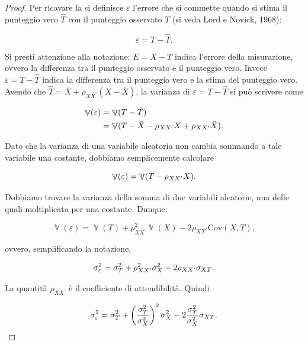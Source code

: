 \documentclass[
  11pt,
]{krantz}
\DeclareMathOperator{\V}{\mathbb{V}} %
\theoremstyle{definition}
\theoremstyle{definition}
\theoremstyle{definition}
\theoremstyle{definition}
\theoremstyle{remark}
\begin{document}
\begin{proof}
Per ricavare la \label{eq:std-err-estimate} si definisce \(\varepsilon\) l'errore che si commette quando si stima il punteggio vero \(\hat{T}\) con il punteggio osservato \(T\) (si veda Lord e Novick, 1968):

\[
\varepsilon = T - \hat{T}.
\]

Si presti attenzione alla notazione: \(E = X - T\) indica l'errore della misurazione, ovvero la differenza tra il punteggio osservato e il punteggio vero. Invece \(\varepsilon = T - \hat{T}\) indica la differenza tra il punteggio vero e la stima del punteggio vero. Avendo che \(\hat{T} = \bar{X} + \rho_{XX^\prime} (X - \bar{X})\), la varianza di \(\varepsilon = T - \hat{T}\) si può scrivere come

\begin{equation}
\begin{aligned}
\V(\varepsilon) &=  \V(T - \hat{T})\notag\\
&= \V(T - \bar{X} - \rho_{XX^\prime} X + \rho_{XX^\prime}\bar{X}).
\end{aligned}
\end{equation}

Dato che la varianza di una variabile aleatoria non cambia sommando a tale variabile una costante, dobbiamo semplicemente calcolare

\begin{equation}
\V(\varepsilon) = \V(T - \rho_{XX^\prime}X).\notag
\end{equation}

Dobbiamo trovare la varianza della somma di due variabili aleatorie, una delle quali moltiplicata per una costante. Dunque:

\[
\V(\varepsilon) = \V(T) + \rho_{XX^\prime}^2 \V(X) - 2 \rho_{XX^\prime} \mbox{Cov}(X,T),
\]

ovvero, semplificando la notazione,

\begin{equation}
\sigma^2_{\varepsilon} = \sigma^2_T + \rho_{XX^\prime}^2 \sigma^2_X - 2  \rho_{XX^\prime} \sigma_{XT}.\notag
\end{equation}

La quantità \(\rho_{XX^\prime}\) è il coefficiente di attendibilità. Quindi

\begin{equation}
\sigma^2_{\varepsilon} = \sigma^2_T + \left(\frac{\sigma_T^2}{\sigma_X^2}\right)^2 \sigma^2_X - 2  \frac{\sigma_T^2}{\sigma_X^2} \sigma_{XT}.\notag
\end{equation}


\end{proof}
\end{document}
